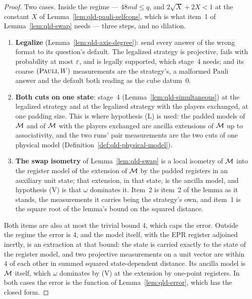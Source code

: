 \begin{proof}
\leanok
Two cases. Inside the regime --- $48md \leq q$, and $2\sqrt{X} + 2X < 1$ at the constant $X$ of
Lemma~\ref{lem:qld-pauli-selfcons}, which is what item~1 of Lemma~\ref{lem:qld-swap} needs ---
three steps, and no dilation.
\begin{enumerate}
\item \textbf{Legalize} (Lemma~\ref{lem:qld-axis-degree}): send every answer of the wrong format
  to its question's default. The legalized strategy is projective, fails with probability at most
  $\eps$, and is legally supported, which stage~4 needs; and its coarse $(\pauli, W)$ measurements
  are the strategy's, a malformed Pauli answer and the default both reading as the cube
  datum~$0$.
\item \textbf{Both cuts on one state}: stage~4 (Lemma~\ref{lem:qld-simultaneous}) at the legalized
  strategy and at the legalized strategy with the players exchanged, at one padding size. This is
  where hypothesis (L) is used: the padded models of $\cal{M}$ and of $\cal{M}$ with the players
  exchanged are ancilla extensions of $\cal{M}$ up to associativity, and the two runs' pair
  measurements are the two cuts of one physical model (Definition~\ref{def:qld-physical-model}).
\item \textbf{The swap isometry} of Lemma~\ref{lem:qld-swap} is a local isometry of $\cal{M}$ into
  the register model of the extension of $\cal{M}$ by the padded registers in an auxiliary unit
  state; that extension, in that state, is the ancilla model, and hypothesis (V) is that
  $\omega$ dominates it. Item~2 is item~2 of the lemma as it stands, the measurements it carries
  being the strategy's own, and item~1 is the square root of the lemma's bound on the squared
  distance.
\end{enumerate}
Both items are also at most the trivial bound $4$, which caps the error. Outside the regime the
error is $4$, and the model itself, with the EPR register adjoined inertly, is an extraction at
that bound: the state is carried exactly to the state of the register model, and two projective
measurements on a unit vector are within $4$ of each other in summed squared state-dependent
distance. Its ancilla model is $\cal{M}$ itself, which $\omega$ dominates by (V) at the
extension by one-point registers. In both cases the error is the function of
Lemma~\ref{lem:qld-error}, which has the closed form.
\end{proof}

